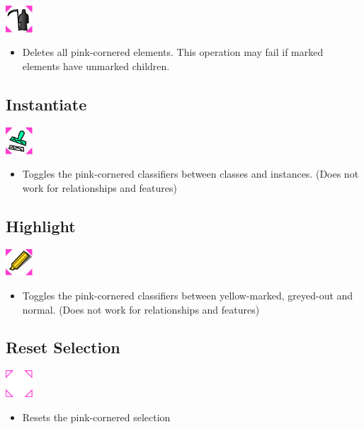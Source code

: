 \includegraphics[width=1cm]{../../gui/source/resources/edit_delete.pdf}
\begin{itemize}
\item Deletes all pink-cornered elements. This operation may fail if marked elements have unmarked children.
\end{itemize}

\subsection{Instantiate}

\includegraphics[width=1cm]{../../gui/source/resources/edit_instantiate.pdf}
\begin{itemize}
\item Toggles the pink-cornered classifiers between classes and instances. (Does not work for relationships and features)
\end{itemize}

\subsection{Highlight}

\includegraphics[width=1cm]{../../gui/source/resources/edit_highlight.pdf}
\begin{itemize}
\item Toggles the pink-cornered classifiers between yellow-marked, greyed-out and normal. (Does not work for relationships and features)
\end{itemize}

\subsection{Reset Selection}

\includegraphics[width=1cm]{../../gui/source/resources/edit_reset.pdf}
\begin{itemize}
\item Resets the pink-cornered selection
\end{itemize}

